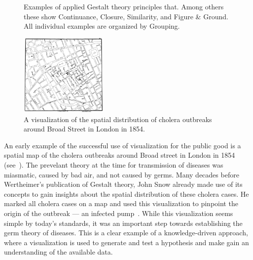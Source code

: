 \begin{figure}
  \centering
  \caption{Examples of applied Gestalt theory principles that.  Among others these show Continuance, Closure, Similarity, and Figure \& Ground.  All individual examples are organized by Grouping.}
  \label{fig:motivation:gestalt}
\end{figure}

\newpage

\begin{figure}
  \centering
    \includegraphics[width=0.38\textwidth]{figures/motivation/cholera.jpg}
    \caption{A visualization of the spatial distribution of cholera outbreaks around Broad Street in London in 1854.}
    \label{fig:motivation:example:cholera}
\end{figure}

An early example of the successful use of visualization for the public good is a spatial map of the cholera outbreaks around Broad street in London in 1854 (see~).  The prevelant theory at the time for transmission of diseases was miasmatic, caused by bad air, and not caused by germs.  Many decades before Wertheimer's publication of Gestalt theory, John Snow already made use of its concepts to gain insights about the spatial distribution of these cholera cases.  He marked all cholera cases on a map and used this visualization to pinpoint the origin of the outbreak --- an infected pump~\cite{snow1855mode}.  While this visualization seems simple by today's standards, it was an important step towards establishing the germ theory of diseases.  This is a clear example of a knowledge-driven approach, where a visualization is used to generate and test a hypothesis and make gain an understanding of the available data.

